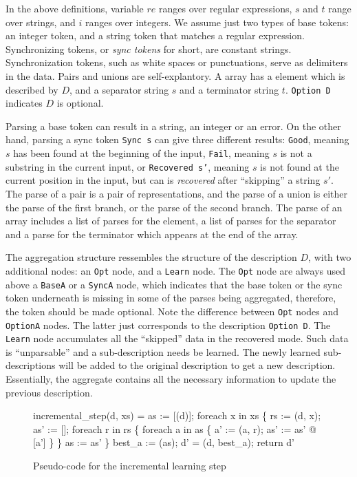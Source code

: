 In the above definitions, variable $re$ ranges over regular expressions,
$s$ and $t$ range over strings, and $i$ ranges over integers.
We assume just two types of base tokens: 
an integer token, and a string token that matches a
regular expression. Synchronizing tokens, or {\em sync tokens} for short, are constant strings. 
Synchronization tokens, such as white spaces or punctuations,
serve as delimiters in the data. Pairs and unions are self-explantory. 
A array has a element which is described by $D$, and a separator string $s$ and a
terminator string $t$. {\tt Option D} indicates $D$ is optional.

Parsing a base token can result in a string, an integer or an error.
On the other hand, parsing a sync token {\tt Sync s} can give three different results: 
{\tt Good}, meaning $s$ has been found at the beginning of the input, 
{\tt Fail}, meaning $s$ is not a substring in the current input, or 
{\tt Recovered s'}, meaning $s$ is not found at the current position in the input, but
can is {\em recovered} after ``skipping'' a string $s'$.
The parse of a pair is a pair of representations, and the
parse of a union is either the parse of the first branch, or the 
parse of the second branch. The parse of an array includes a list of parses for the element,
a list of parses for the separator and a parse for the terminator which appears at the end of
the array.

The aggregation structure ressembles the structure of the description $D$, 
with two additional nodes: an {\tt Opt} node, and a {\tt Learn} node. 
The {\tt Opt} node are always used above a {\tt BaseA} or a {\tt SyncA} node,
which indicates that the base token or the sync token underneath is missing in some of the parses
being aggregated, therefore, the token should be made optional.
Note the difference between {\tt Opt} nodes and {\tt OptionA} nodes. The latter 
just corresponds to the description {\tt Option D}. 
The {\tt Learn} node accumulates all the ``skipped'' data in the recovered mode. 
Such data is  ``unparsable'' and a sub-description needs be learned. The newly learned sub-descriptions 
will be added to the original description to get a new description. 
Essentially, the aggregate contains all the necessary information
to update the previous description.

\begin{figure}[t]
\begin{codebox}
incremental_step(d, xs) =
  as := [(d)];
  foreach x in xs \{
    rs := (d, x);
    as' := [];
    foreach r in rs \{
      foreach a in as \{
        a' := (a, r); 
        as' := as' @ [a']
      \}
    \}
    as := as'
  \} 
  best_a := (as);
  d' = (d, best_a);  
  return d'
\end{codebox}
\caption{Pseudo-code for the incremental learning step}
\label{fig:inc-learning}
\end{figure}

